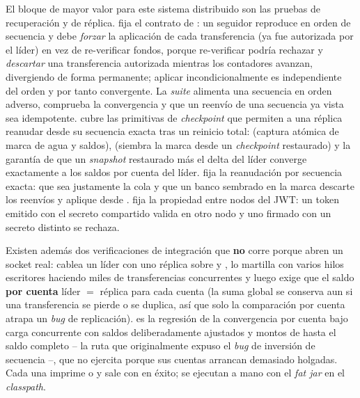 El bloque de mayor valor para este sistema distribuido son las pruebas de
recuperación y de réplica.  fija el contrato de
: un seguidor reproduce en orden de secuencia y debe
\emph{forzar} la aplicación de cada transferencia (ya fue autorizada por el líder)
en vez de re-verificar fondos, porque re-verificar podría rechazar y
\emph{descartar} una transferencia autorizada mientras los contadores avanzan,
divergiendo de forma permanente; aplicar incondicionalmente es independiente del
orden y por tanto convergente. La \emph{suite} alimenta una secuencia en orden
adverso, comprueba la convergencia y que un reenvío de una secuencia ya vista sea
idempotente.  cubre las
primitivas de \emph{checkpoint} que permiten a una réplica reanudar desde su
secuencia exacta tras un reinicio total:  (captura
atómica de marca de agua y saldos),  (siembra la marca
desde un \emph{checkpoint} restaurado) y la garantía de que un \emph{snapshot}
restaurado más el delta del líder converge exactamente a los saldos por cuenta
del líder.  fija la reanudación por secuencia exacta:
que  sea justamente la cola  y que un banco
sembrado en la marca  descarte los reenvíos  y aplique desde
.  fija la propiedad entre nodos del
JWT: un token emitido con el secreto compartido valida en otro nodo y uno firmado
con un secreto distinto se rechaza.

Existen además dos verificaciones de integración que \textbf{no} corre
 porque abren un socket real:
 cablea un  líder con uno réplica
sobre  y , lo martilla con varios hilos
escritores haciendo miles de transferencias concurrentes y luego exige que el
saldo \textbf{por cuenta} líder $=$ réplica para cada cuenta (la suma global se
conserva aun si una transferencia se pierde o se duplica, así que solo la
comparación por cuenta atrapa un \emph{bug} de replicación). 
es la regresión de la convergencia por cuenta bajo carga concurrente con saldos
deliberadamente ajustados y montos de hasta el saldo completo -- la ruta que
originalmente expuso el \emph{bug} de inversión de secuencia --, que
 no ejercita porque sus cuentas arrancan demasiado holgadas. Cada una imprime  o
 y sale con  en éxito; se ejecutan a mano
con el \emph{fat jar} en el \emph{classpath}.


